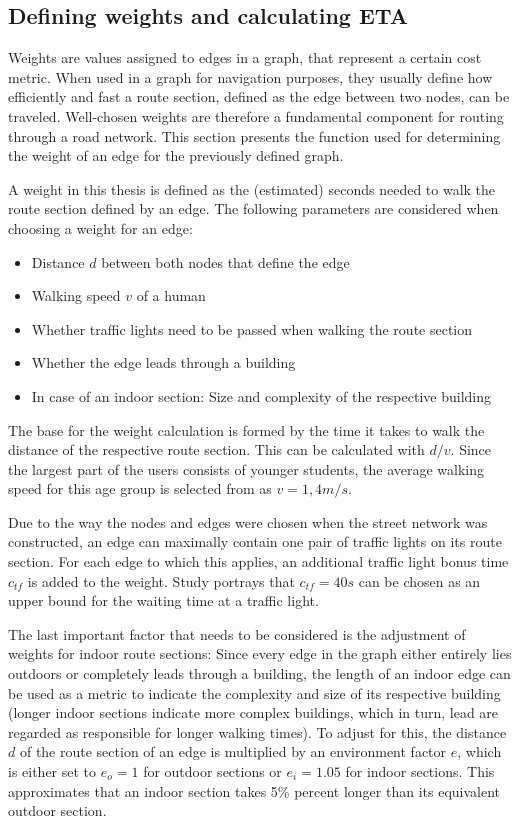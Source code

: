 \subsection{Defining weights and calculating ETA}
Weights are values assigned to edges in a graph, that represent a certain cost metric. When used in a graph for navigation purposes, they usually define how efficiently and fast a route section, defined as the edge between two nodes, can be traveled. Well-chosen weights are therefore a fundamental component for routing through a road network. This section presents the function used for determining the weight of an edge for the previously defined graph.

A weight in this thesis is defined as the (estimated) seconds needed to walk the route section defined by an edge. The following parameters are considered when choosing a weight for an edge:

\begin{itemize}
	\item Distance $d$ between both nodes that define the edge
	\item Walking speed $v$ of a human
	\item Whether traffic lights need to be passed when walking the route section
	\item Whether the edge leads through a building
	\item In case of an indoor section: Size and complexity of the respective building
\end{itemize}

The base for the weight calculation is formed by the time it takes to walk the distance of the respective route section. This can be calculated with $d / v$. Since the largest part of the users consists of younger students, the average walking speed for this age group is selected from \cite{average_walking_speed} as $v = 1,4 m/s$.

Due to the way the nodes and edges were chosen when the street network was constructed, an edge can maximally contain one pair of traffic lights on its route section. For each edge to which this applies, an additional traffic light bonus time $c_{tf}$ is added to the weight. Study \cite{traffic_light_waiting_time} portrays that $c_{tf} = 40 s$ can be chosen as an upper bound for the waiting time at a traffic light.

The last important factor that needs to be considered is the adjustment of weights for indoor route sections: Since every edge in the graph either entirely lies outdoors or completely leads through a building, the length of an indoor edge can be used as a metric to indicate the complexity and size of its respective building (longer indoor sections indicate more complex buildings, which in turn, lead are regarded as responsible for longer walking times). To adjust for this, the distance $d$ of the route section of an edge is multiplied by an environment factor $e$, which is either set to $e_{o} = 1$ for outdoor sections or $e_{i} = 1.05$ for indoor sections. This approximates that an indoor section takes 5\% percent longer than its equivalent outdoor section.

